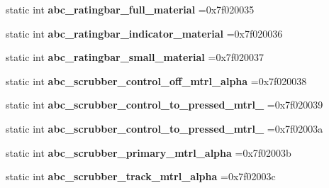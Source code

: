 \begin{DoxyCompactItemize}
static int {\bfseries abc\+\_\+ratingbar\+\_\+full\+\_\+material} =0x7f020035
\item 
\mbox{\label{classandroid_1_1support_1_1design_1_1R_1_1drawable_a380f9ef99b7497f6008ea7b0a70b2dc4}} 
static int {\bfseries abc\+\_\+ratingbar\+\_\+indicator\+\_\+material} =0x7f020036
\item 
\mbox{\label{classandroid_1_1support_1_1design_1_1R_1_1drawable_a8c44747e3639ff2571a3eea97c36fac5}} 
static int {\bfseries abc\+\_\+ratingbar\+\_\+small\+\_\+material} =0x7f020037
\item 
\mbox{\label{classandroid_1_1support_1_1design_1_1R_1_1drawable_a4d0537c70bd5b727dd3528aeb49944f2}} 
static int {\bfseries abc\+\_\+scrubber\+\_\+control\+\_\+off\+\_\+mtrl\+\_\+alpha} =0x7f020038
\item 
\mbox{\label{classandroid_1_1support_1_1design_1_1R_1_1drawable_a0b9fc0e06cee690b5d883445679c57ce}} 
static int {\bfseries abc\+\_\+scrubber\+\_\+control\+\_\+to\+\_\+pressed\+\_\+mtrl\+\_} =0x7f020039
\item 
\mbox{\label{classandroid_1_1support_1_1design_1_1R_1_1drawable_aefcfe84de0dd07a12a75a10042a111b7}} 
static int {\bfseries abc\+\_\+scrubber\+\_\+control\+\_\+to\+\_\+pressed\+\_\+mtrl\+\_} =0x7f02003a
\item 
\mbox{\label{classandroid_1_1support_1_1design_1_1R_1_1drawable_aa9239a39aea370e5e346d3a2c24c7a62}} 
static int {\bfseries abc\+\_\+scrubber\+\_\+primary\+\_\+mtrl\+\_\+alpha} =0x7f02003b
\item 
\mbox{\label{classandroid_1_1support_1_1design_1_1R_1_1drawable_acf9c9925f60686905c24d601b55dde2d}} 
static int {\bfseries abc\+\_\+scrubber\+\_\+track\+\_\+mtrl\+\_\+alpha} =0x7f02003c
\item 
\mbox{\label{classandroid_1_1support_1_1design_1_1R_1_1drawable_a278c13ffb26a91e32d2bb41028b9d37d}} 

\end{DoxyCompactItemize}
